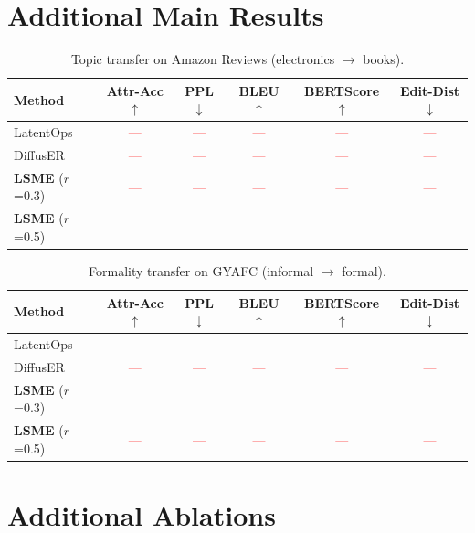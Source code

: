 \documentclass{article}
\newcommand{\tbd}[1]{\textcolor{red}{#1}}  %
\begin{document}
\section{Additional Main Results}
\label{app:additional_results}

\begin{table}[h]
\centering
\caption{Topic transfer on Amazon Reviews (electronics $\to$ books).}
\label{tab:amazon_results}
\small
\begin{tabular}{lccccc}
\toprule
\textbf{Method} & \textbf{Attr-Acc} $\uparrow$ & \textbf{PPL} $\downarrow$ & \textbf{BLEU} $\uparrow$ & \textbf{BERTScore} $\uparrow$ & \textbf{Edit-Dist} $\downarrow$ \\
\midrule
LatentOps & \tbd{---} & \tbd{---} & \tbd{---} & \tbd{---} & \tbd{---} \\
DiffusER & \tbd{---} & \tbd{---} & \tbd{---} & \tbd{---} & \tbd{---} \\
\midrule
\textbf{LSME} ($r$=0.3) & \tbd{---} & \tbd{---} & \tbd{---} & \tbd{---} & \tbd{---} \\
\textbf{LSME} ($r$=0.5) & \tbd{---} & \tbd{---} & \tbd{---} & \tbd{---} & \tbd{---} \\
\bottomrule
\end{tabular}
\end{table}

\begin{table}[h]
\centering
\caption{Formality transfer on GYAFC (informal $\to$ formal).}
\label{tab:gyafc_results}
\small
\begin{tabular}{lccccc}
\toprule
\textbf{Method} & \textbf{Attr-Acc} $\uparrow$ & \textbf{PPL} $\downarrow$ & \textbf{BLEU} $\uparrow$ & \textbf{BERTScore} $\uparrow$ & \textbf{Edit-Dist} $\downarrow$ \\
\midrule
LatentOps & \tbd{---} & \tbd{---} & \tbd{---} & \tbd{---} & \tbd{---} \\
DiffusER & \tbd{---} & \tbd{---} & \tbd{---} & \tbd{---} & \tbd{---} \\
\midrule
\textbf{LSME} ($r$=0.3) & \tbd{---} & \tbd{---} & \tbd{---} & \tbd{---} & \tbd{---} \\
\textbf{LSME} ($r$=0.5) & \tbd{---} & \tbd{---} & \tbd{---} & \tbd{---} & \tbd{---} \\
\bottomrule
\end{tabular}
\end{table}

\section{Additional Ablations}
\label{app:ablation_extra}
\end{document}
